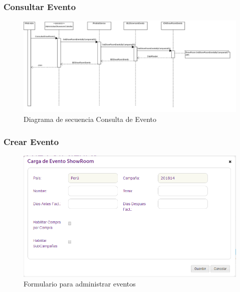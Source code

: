 \documentclass[a4paper,11pt]{paper}
\begin{document}
\newpage
\begin{landscape}
\subsubsection{Consultar Evento}
\begin{figure}[!h]
\centering
\includegraphics[width=1.5\textwidth]{imgs/Eventos/ConsultarEvento.png}
\caption{Diagrama de secuencia Consulta de Evento}
\end{figure}
\end{landscape} 





\newpage
\subsubsection{Crear Evento}

\begin{figure}[h]
\centering
\includegraphics[width=1.0\textwidth]{imgs/Eventos/FormularioNuevoEvento.png}
\caption{Formulario para administrar eventos}
\end{figure}
\end{document}
